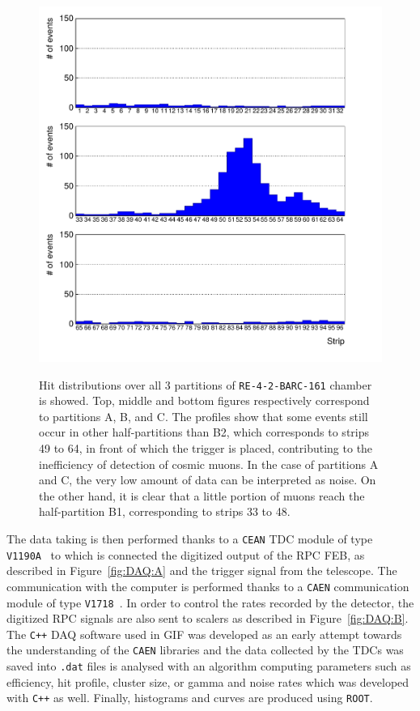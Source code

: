 		\begin{figure}[H]
		\centering
		\includegraphics[width = 0.7\plotwidth]{fig/chapt5/Data-21-profile.pdf}\\
		\caption{\label{fig:HitProf} Hit distributions over all 3 partitions of \texttt{RE-4-2-BARC-161} chamber is showed. Top, middle and bottom figures respectively correspond to partitions A, B, and C. The profiles show that some events still occur in other half-partitions than B2, which corresponds to strips 49 to 64, in front of which the trigger is placed, contributing to the inefficiency of detection of cosmic muons. In the case of partitions A and C, the very low amount of data can be interpreted as noise. On the other hand, it is clear that a little portion of muons reach the half-partition B1, corresponding to strips 33 to 48.}
	\end{figure}
	
	The data taking is then performed thanks to a \texttt{CEAN} TDC module of type \texttt{V1190A}~\cite{V1190AMUT} to which is connected the digitized output of the RPC \acl{FEB}, as described in Figure~\ref{fig:DAQ:A} and the trigger signal from the telescope. The communication with the computer is performed thanks to a \texttt{CAEN} communication module of type \texttt{V1718}~\cite{V1718MUT}. In order to control the rates recorded by the detector, the digitized RPC signals are also sent to scalers as described in Figure~\ref{fig:DAQ:B}. The \texttt{C++} DAQ software used in GIF was developed as an early attempt towards the understanding of the \texttt{CAEN} libraries and the data collected by the TDCs was saved into \texttt{.dat} files is analysed with an algorithm computing parameters such as efficiency, hit profile, cluster size, or gamma and noise rates which was developed with \texttt{C++} as well. Finally, histograms and curves are produced using \texttt{ROOT}.

